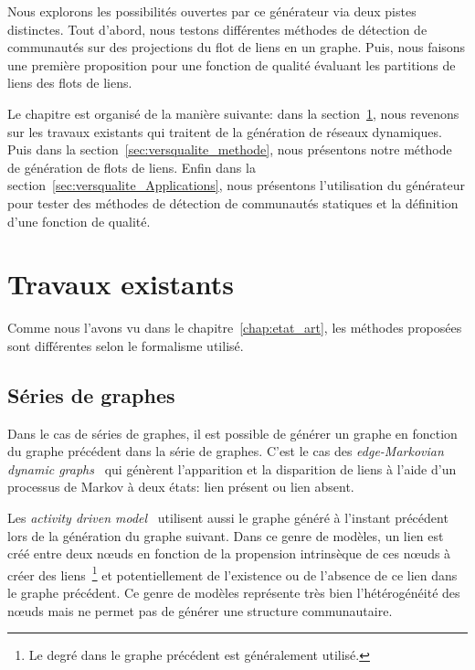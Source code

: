\bigskip
Nous explorons les possibilités ouvertes par ce générateur via deux pistes distinctes.
Tout d'abord, nous testons différentes méthodes de détection de communautés sur des projections du flot de liens en un graphe.
Puis, nous faisons une première proposition pour une fonction de qualité évaluant les partitions de liens des flots de liens.

\bigskip

Le chapitre est organisé de la manière suivante: dans la section~\ref{sec:versqualite_existant}, nous revenons sur les travaux existants qui traitent de la génération de réseaux dynamiques.
Puis dans la section~\ref{sec:versqualite_methode}, nous présentons notre méthode de génération de flots de liens.
Enfin dans la section~\ref{sec:versqualite_Applications}, nous présentons l'utilisation du générateur pour tester des méthodes de détection de communautés statiques et la définition d'une fonction de qualité.

\section{Travaux existants}
\label{sec:versqualite_existant}

Comme nous l'avons vu dans le chapitre~\ref{chap:etat_art}, les méthodes proposées sont différentes selon le formalisme utilisé.

\subsection{Séries de graphes}
Dans le cas de séries de graphes, il est possible de générer un graphe en fonction du graphe précédent dans la série de graphes.
C'est le cas des \emph{edge-Markovian dynamic graphs}~\cite{Clementi2008} qui génèrent l'apparition et la disparition de liens à l'aide d'un processus de Markov à deux états: lien présent ou lien absent.

Les \emph{activity driven model}~\cite{Perra2012,Laurent2015a,Moinet2015} utilisent aussi le graphe généré à l'instant précédent lors de la génération du graphe suivant.
Dans ce genre de modèles, un lien est créé entre deux n\oe{}uds en fonction de la propension intrinsèque de ces n\oe{}uds à créer des liens~\footnote{Le degré dans le graphe précédent est généralement utilisé.} et potentiellement de l'existence ou de l'absence de ce lien dans le graphe précédent.
Ce genre de modèles représente très bien l'hétérogénéité des n\oe{}uds mais ne permet pas de générer une structure communautaire.


